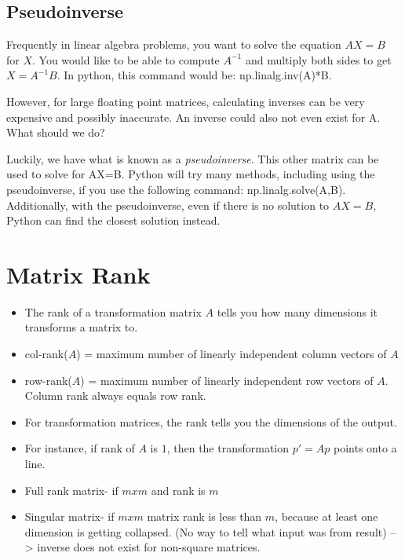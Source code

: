 \documentclass{article}
\begin{document}
\subsection{Pseudoinverse}

Frequently in linear algebra problems, you want to solve the equation $AX=B$ for $X$. You would like to be able to compute $A^{-1}$ and multiply both sides to get $X=A^{-1}B$. In python, this command would be: np.linalg.inv(A)*B.

However, for large floating point matrices, calculating inverses can be very expensive and possibly inaccurate. An inverse could also not even exist for A. What should we do?

Luckily, we have what is known as a \textit{pseudoinverse}. This other matrix can be used to solve for AX=B. Python will try many methods, including using the pseudoinverse, if you use the following command: np.linalg.solve(A,B). Additionally, with the pseudoinverse, even if there is no solution to $AX=B$, Python can find the closest solution instead.

\section{Matrix Rank}
\begin{itemize}
\item The rank of a transformation matrix  $A$ tells you how many dimensions it transforms a matrix to. 

\item col-rank($A$) = maximum number of linearly independent column vectors of $A$

\item row-rank($A$) = maximum number of linearly independent row vectors of $A$.
Column rank always equals row rank. 

\item For transformation matrices, the rank tells you the dimensions of the output. 

\item For instance, if rank of $A$ is $1$, then the transformation $p' =Ap$ points onto a line.

\item Full rank matrix- if $mxm$ and rank is $m$

\item Singular matrix- if $mxm$ matrix rank is less than $m$, because at least one dimension is getting collapsed. (No way to tell what input was from result) --> inverse does not exist for non-square matrices. 
\end{itemize}
\end{document}
